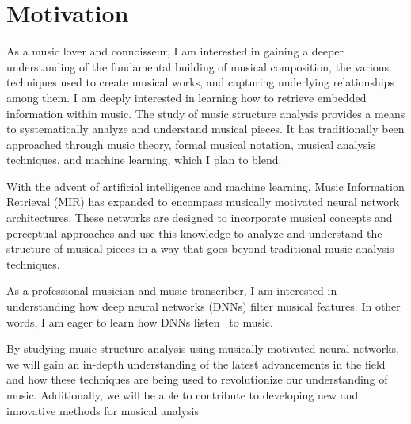 \section{Motivation}

As a music lover and connoisseur, I am interested in gaining a deeper understanding of the fundamental building of musical composition, the various techniques used to create musical works, and capturing underlying relationships among them. I am deeply interested in learning how to retrieve embedded information within music. The study of music structure analysis provides a means to systematically analyze and understand musical pieces. It has traditionally been approached through music theory, formal musical notation, musical analysis techniques, and machine learning, which I plan to blend.

With the advent of artificial intelligence and machine learning, Music Information Retrieval (MIR) has expanded to encompass musically motivated neural network architectures. These networks are designed to incorporate musical concepts and perceptual approaches and use this knowledge to analyze and understand the structure of musical pieces in a way that goes beyond traditional music analysis techniques.

As a professional musician and music transcriber, I am interested in understanding how deep neural networks (DNNs) filter musical features. In other words, I am eager to learn how DNNs listen~\cite{7500246} to music.

By studying music structure analysis using musically motivated neural networks, we will gain an in-depth understanding of the latest advancements in the field and how these techniques are being used to revolutionize our understanding of music. Additionally, we will be able to contribute to developing new and innovative methods for musical analysis~\cite{Huang2019MusicTG}
